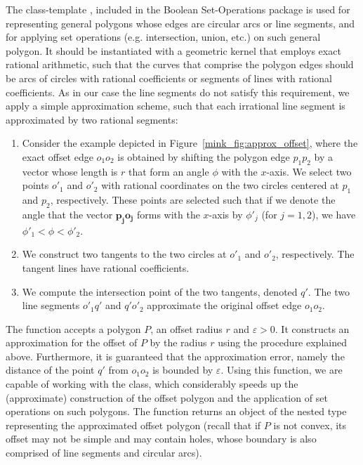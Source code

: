 The class-template , included in
the Boolean Set-Operations package is used for representing general polygons
whose edges are circular arcs or line segments, and for applying set operations
(e.g. intersection, union, etc.) on such general polygon. It should be
instantiated with a geometric kernel that employs exact rational arithmetic,
such that the curves that comprise the polygon edges should be arcs of
circles with rational coefficients or segments of lines with rational
coefficients. As in our case the line segments do not satisfy this requirement,
we apply a simple approximation scheme, such that each irrational line
segment is approximated by two rational segments:
\begin{enumerate}
\item
Consider the example depicted in Figure~\ref{mink_fig:approx_offset}, where
the exact offset edge $o_1 o_2$ is obtained by shifting the polygon edge
$p_1 p_2$ by a vector whose length is $r$ that form an angle $\phi$ with the
$x$-axis. We select two points $o'_1$ and $o'_2$ with rational coordinates
on the two circles centered at $p_1$ and $p_2$, respectively. These points
are selected such that if we denote the angle that the vector 
${\mathbf{p_j o_j}}$
forms with the $x$-axis by $\phi'_j$ (for $j = 1, 2$), we have
$\phi'_1 < \phi < \phi'_2$.
%
\item
We construct two tangents to the two circles at $o'_1$ and $o'_2$,
respectively. The tangent lines have rational coefficients.
%
\item
We compute the intersection point of the two tangents, denoted $q'$.
The two line segments $o'_1 q'$ and $q' o'_2$ approximate the original
offset edge $o_1 o_2$.
\end{enumerate}

The function  accepts a polygon
$P$, an offset radius $r$ and $\varepsilon > 0$. It constructs an
approximation for the offset of $P$ by the radius $r$ using the procedure
explained above. Furthermore, it is guaranteed that the approximation error,
namely the distance of the point $q'$ from $o_1 o_2$ is bounded by
$\varepsilon$. Using this function, we are capable of working with the
 class, which considerably
speeds up the (approximate) construction of the offset polygon and the
application of set operations on such polygons. The function returns an
object of the nested type
 representing
the approximated offset polygon (recall that if $P$ is not convex, its
offset may not be simple and may contain holes, whose boundary is also comprised
of line segments and circular arcs).

